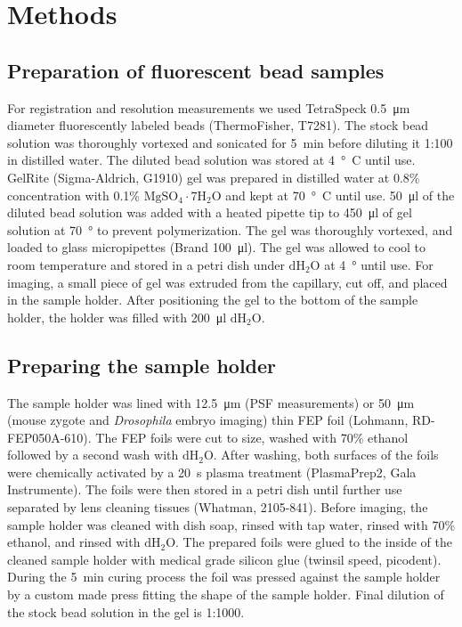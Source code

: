   



\section{Methods}
    \label{sec:methods2}

  \subsection{Preparation of fluorescent bead samples}
    \label{sec:beads}
    For registration and resolution measurements we used TetraSpeck \SI{0.5}{\micro m} diameter fluorescently labeled beads (ThermoFisher, T7281). The stock bead solution was thoroughly vortexed and sonicated for \SI{5}{min} before diluting it 1:100 in distilled water. The diluted bead solution was stored at \SI{4}{\degree C} until use. GelRite (Sigma-Aldrich, G1910) gel was prepared in distilled water at 0.8\% concentration with 0.1\% $\mathrm{MgSO_4\cdot 7 H_2O}$ and kept at \SI{70}{\degree C} until use. \SI{50}{\micro l} of the diluted bead solution was added with a heated pipette tip to \SI{450}{\micro l} of gel solution at \SI{70}{\degree} to prevent  polymerization. The gel was thoroughly vortexed, and loaded to glass micropipettes (Brand \SI{100}{\micro l}). The gel was allowed to cool to room temperature and stored in a petri dish under $\mathrm{dH_2O}$ at \SI{4}{\degree} until use. For imaging, a small piece of gel was extruded from the capillary, cut off, and placed in the sample holder. After positioning the gel to the bottom of the sample holder, the holder was filled with \SI{200}{\micro l} $\mathrm{dH_2O}$.

  \subsection{Preparing the sample holder}
    The sample holder was lined with \SI{12.5}{\micro m} (PSF measurements) or \SI{50}{\micro m} (mouse zygote and \textit{Drosophila} embryo imaging) thin FEP foil (Lohmann, RD-FEP050A-610). The FEP foils were cut to size, washed with 70\% ethanol followed by a second wash with $\mathrm{dH_2O}$. After washing, both surfaces of the foils were chemically activated by a \SI{20}{s} plasma treatment (PlasmaPrep2, Gala Instrumente). The foils were then stored in a petri dish until further use separated by lens cleaning tissues (Whatman, 2105-841). Before imaging, the sample holder was cleaned with dish soap, rinsed with tap water, rinsed with 70\% ethanol, and rinsed with $\mathrm{dH_2O}$. The prepared foils were glued to the inside of the cleaned sample holder with medical grade silicon glue (twinsil speed, picodent). During the \SI{5}{min} curing process the foil was pressed against the sample holder by a custom made press fitting the shape of the sample holder. Final dilution of the stock bead solution in the gel is 1:1000.

